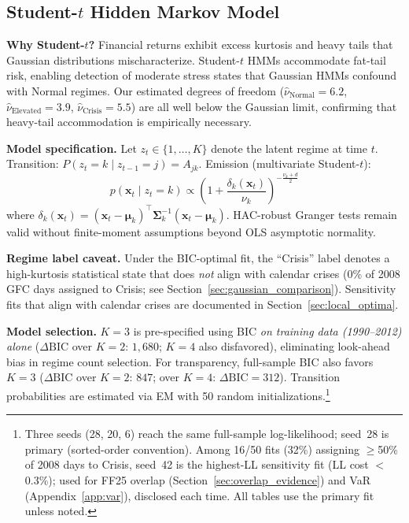\documentclass[sigconf,anonymous]{acmart}
\begin{document}
\subsection{Student-\texorpdfstring{$t$}{t} Hidden Markov Model}

\textbf{Why Student-$t$?} Financial returns exhibit excess kurtosis
and heavy tails that Gaussian distributions mischaracterize.
Student-$t$ HMMs accommodate fat-tail risk, enabling detection of
moderate stress states that Gaussian HMMs confound with Normal regimes.
Our estimated degrees of freedom ($\hat{\nu}_{\text{Normal}} = 6.2$,
$\hat{\nu}_{\text{Elevated}} = 3.9$, $\hat{\nu}_{\text{Crisis}} = 5.5$)
are all well below the Gaussian limit, confirming that heavy-tail
accommodation is empirically necessary.

\textbf{Model specification.}
Let $z_t \in \{1, \ldots, K\}$ denote the latent regime at time $t$.
Transition: $P(z_t = k \mid z_{t-1} = j) = A_{jk}$.
Emission (multivariate Student-$t$):
\begin{equation}
p(\mathbf{x}_t \mid z_t = k) \propto \left(1 + \frac{\delta_k(\mathbf{x}_t)}{\nu_k}\right)^{-\frac{\nu_k+d}{2}}
\end{equation}
where $\delta_k(\mathbf{x}_t) = (\mathbf{x}_t - \boldsymbol{\mu}_k)^\top\boldsymbol{\Sigma}_k^{-1}(\mathbf{x}_t - \boldsymbol{\mu}_k)$.
HAC-robust Granger tests remain valid without finite-moment assumptions
beyond OLS asymptotic normality.

\textbf{Regime label caveat.} Under the BIC-optimal fit, the ``Crisis'' label
denotes a high-kurtosis statistical state that does \emph{not} align with
calendar crises (0\% of 2008 GFC days assigned to Crisis; see
Section~\ref{sec:gaussian_comparison}). Sensitivity fits that align with
calendar crises are documented in Section~\ref{sec:local_optima}.

\textbf{Model selection.} $K = 3$ is pre-specified using BIC
\emph{on training data (1990--2012) alone}
($\Delta\text{BIC}$ over $K = 2$: $1{,}680$; $K = 4$ also disfavored),
eliminating look-ahead bias in regime count selection.
For transparency, full-sample BIC also favors $K = 3$ ($\Delta\text{BIC}$
over $K = 2$: $847$; over $K = 4$: $\Delta\text{BIC} = 312$). Transition
probabilities are estimated via EM with 50 random
initializations.\footnote{Three seeds (28, 20, 6) reach the same full-sample
log-likelihood; seed~28 is primary (sorted-order convention).
Among 16/50 fits (32\%) assigning $\geq$50\% of 2008 days to Crisis,
seed~42 is the highest-LL sensitivity fit (LL cost $<$0.3\%); used for
FF25 overlap (Section~\ref{sec:overlap_evidence}) and VaR
(Appendix~\ref{app:var}), disclosed each time. All tables use the primary
fit unless noted.}
\end{document}
